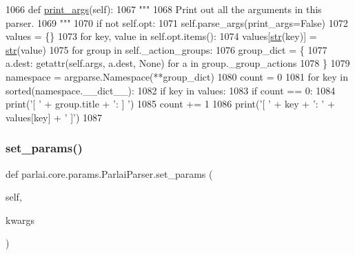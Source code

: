 \begin{DoxyCode}
1066     \textcolor{keyword}{def }\hyperlink{namespaceparlai_1_1tasks_1_1talkthewalk_1_1run_aaaa6dd17c737d50be241dc6844bfc581}{print\_args}(self):
1067         \textcolor{stringliteral}{"""}
1068 \textcolor{stringliteral}{        Print out all the arguments in this parser.}
1069 \textcolor{stringliteral}{        """}
1070         \textcolor{keywordflow}{if} \textcolor{keywordflow}{not} self.opt:
1071             self.parse\_args(print\_args=\textcolor{keyword}{False})
1072         values = \{\}
1073         \textcolor{keywordflow}{for} key, value \textcolor{keywordflow}{in} self.opt.items():
1074             values[\hyperlink{namespacegenerate__task__READMEs_a5b88452ffb87b78c8c85ececebafc09f}{str}(key)] = \hyperlink{namespacegenerate__task__READMEs_a5b88452ffb87b78c8c85ececebafc09f}{str}(value)
1075         \textcolor{keywordflow}{for} group \textcolor{keywordflow}{in} self.\_action\_groups:
1076             group\_dict = \{
1077                 a.dest: getattr(self.args, a.dest, \textcolor{keywordtype}{None}) \textcolor{keywordflow}{for} a \textcolor{keywordflow}{in} group.\_group\_actions
1078             \}
1079             namespace = argparse.Namespace(**group\_dict)
1080             count = 0
1081             \textcolor{keywordflow}{for} key \textcolor{keywordflow}{in} sorted(namespace.\_\_dict\_\_):
1082                 \textcolor{keywordflow}{if} key \textcolor{keywordflow}{in} values:
1083                     \textcolor{keywordflow}{if} count == 0:
1084                         print(\textcolor{stringliteral}{'[ '} + group.title + \textcolor{stringliteral}{': ] '})
1085                     count += 1
1086                     print(\textcolor{stringliteral}{'[  '} + key + \textcolor{stringliteral}{': '} + values[key] + \textcolor{stringliteral}{' ]'})
1087 
\end{DoxyCode}
\mbox{\label{classparlai_1_1core_1_1params_1_1ParlaiParser_a6f1dc42e86af57a7fc4ef9a4c68ca247}} 
\subsubsection{\texorpdfstring{set\+\_\+params()}{set\_params()}}
{\footnotesize\ttfamily def parlai.\+core.\+params.\+Parlai\+Parser.\+set\+\_\+params (\begin{DoxyParamCaption}\item[{}]{self,  }\item[{}]{kwargs }\end{DoxyParamCaption})}

